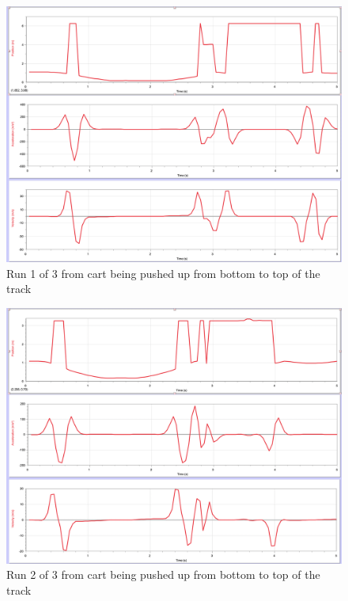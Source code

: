 \documentclass[idxtotoc,hyperref,openany]{labbook} %
\begin{document}
\begin{figure}[H] %
\begin{center}
\includegraphics[width=1\linewidth]{images/Lab.02/PushUp1.png}
\end{center}
\caption{Run 1 of 3 from cart being pushed up from bottom to top of the track}
\label{fig:Data of Cart PushUp1}
\end{figure}

\begin{figure}[H] %
\begin{center}
\includegraphics[width=1\linewidth]{images/Lab.02/PushUp2.png}
\end{center}
\caption{Run 2 of 3 from cart being pushed up from bottom to top of the track}
\label{fig:Data of Cart PushUp2}
\end{figure}
\end{document}

